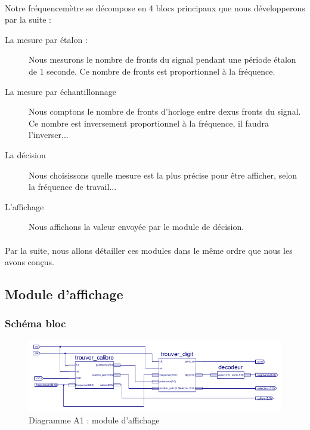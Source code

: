 \documentclass[a4paper,11pt]{article}
\begin{document}
\paragraph{} Notre fréquencemètre se décompose en 4 blocs principaux que nous développerons par la suite : 
\begin{description}
  \item[La mesure par étalon : ] Nous mesurons le nombre de fronts du signal pendant une période étalon de 1 seconde. Ce nombre de fronts est
  proportionnel à la fréquence.
  \item[La mesure par échantillonnage] Nous comptons le nombre de fronts d'horloge entre dexus fronts du signal. Ce nombre est
  inversement proportionnel à la fréquence, il faudra l'inverser...
  \item[La décision] Nous choisissons quelle mesure est la plus précise pour être afficher, selon la fréquence de travail...
  \item[L'affichage] Nous affichons la valeur envoyée par le module de décision.
\end{description}

\paragraph{} Par la suite, nous allons détailler ces modules dans le même ordre que nous les avons conçus.

\subsection{Module d'affichage}
  \subsubsection{Schéma bloc}
  
  \begin{figure}[H]
\begin{center}
	\includegraphics[scale=1]{sch-afficheur.png}
	\caption{Diagramme A1 : module d'affichage}
\end{center}
\end{figure}
\end{document}
